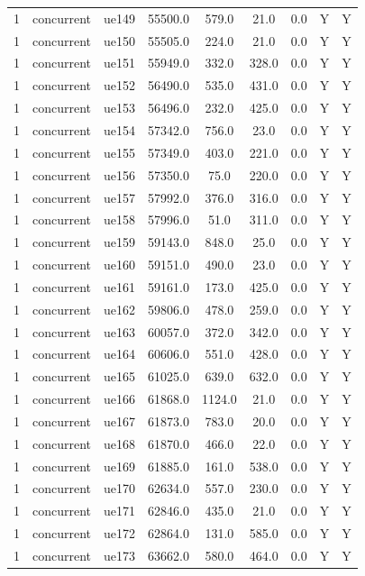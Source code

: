 \begin{table}[ht]
\begin{tabular}{|c|c|c|c|c|c|c|c|c|}
1 & concurrent & ue149 & 55500.0 & 579.0 & 21.0 & 0.0 & Y & Y \\
1 & concurrent & ue150 & 55505.0 & 224.0 & 21.0 & 0.0 & Y & Y \\
1 & concurrent & ue151 & 55949.0 & 332.0 & 328.0 & 0.0 & Y & Y \\
1 & concurrent & ue152 & 56490.0 & 535.0 & 431.0 & 0.0 & Y & Y \\
1 & concurrent & ue153 & 56496.0 & 232.0 & 425.0 & 0.0 & Y & Y \\
1 & concurrent & ue154 & 57342.0 & 756.0 & 23.0 & 0.0 & Y & Y \\
1 & concurrent & ue155 & 57349.0 & 403.0 & 221.0 & 0.0 & Y & Y \\
1 & concurrent & ue156 & 57350.0 & 75.0 & 220.0 & 0.0 & Y & Y \\
1 & concurrent & ue157 & 57992.0 & 376.0 & 316.0 & 0.0 & Y & Y \\
1 & concurrent & ue158 & 57996.0 & 51.0 & 311.0 & 0.0 & Y & Y \\
1 & concurrent & ue159 & 59143.0 & 848.0 & 25.0 & 0.0 & Y & Y \\
1 & concurrent & ue160 & 59151.0 & 490.0 & 23.0 & 0.0 & Y & Y \\
1 & concurrent & ue161 & 59161.0 & 173.0 & 425.0 & 0.0 & Y & Y \\
1 & concurrent & ue162 & 59806.0 & 478.0 & 259.0 & 0.0 & Y & Y \\
1 & concurrent & ue163 & 60057.0 & 372.0 & 342.0 & 0.0 & Y & Y \\
1 & concurrent & ue164 & 60606.0 & 551.0 & 428.0 & 0.0 & Y & Y \\
1 & concurrent & ue165 & 61025.0 & 639.0 & 632.0 & 0.0 & Y & Y \\
1 & concurrent & ue166 & 61868.0 & 1124.0 & 21.0 & 0.0 & Y & Y \\
1 & concurrent & ue167 & 61873.0 & 783.0 & 20.0 & 0.0 & Y & Y \\
1 & concurrent & ue168 & 61870.0 & 466.0 & 22.0 & 0.0 & Y & Y \\
1 & concurrent & ue169 & 61885.0 & 161.0 & 538.0 & 0.0 & Y & Y \\
1 & concurrent & ue170 & 62634.0 & 557.0 & 230.0 & 0.0 & Y & Y \\
1 & concurrent & ue171 & 62846.0 & 435.0 & 21.0 & 0.0 & Y & Y \\
1 & concurrent & ue172 & 62864.0 & 131.0 & 585.0 & 0.0 & Y & Y \\
1 & concurrent & ue173 & 63662.0 & 580.0 & 464.0 & 0.0 & Y & Y \\

\end{tabular}
\end{table}
